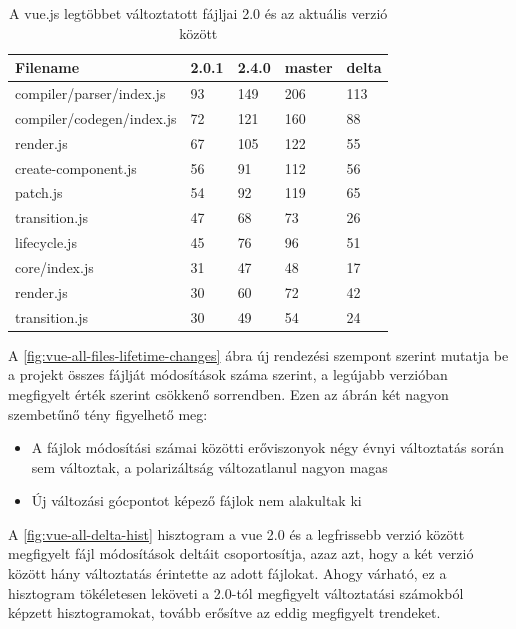 \begin{table}[h]
    \centering
    \begin{tabular}{l|l|l|l|l}
        Filename                  & 2.0.1 & 2.4.0 & master & delta \\ \hline
        compiler/parser/index.js  & 93    & 149   & 206    & 113   \\
        compiler/codegen/index.js & 72    & 121   & 160    & 88    \\
        render.js                 & 67    & 105   & 122    & 55    \\
        create-component.js       & 56    & 91    & 112    & 56    \\
        patch.js                  & 54    & 92    & 119    & 65    \\
        transition.js             & 47    & 68    & 73     & 26    \\
        lifecycle.js              & 45    & 76    & 96     & 51    \\
        core/index.js             & 31    & 47    & 48     & 17    \\
        render.js                 & 30    & 60    & 72     & 42    \\
        transition.js             & 30    & 49    & 54     & 24
    \end{tabular}
    \caption{A vue.js legtöbbet változtatott fájljai 2.0 és az aktuális verzió között}
    \label{tab:vue-changes-comp}
\end{table}

A \ref{fig:vue-all-files-lifetime-changes} ábra új rendezési szempont szerint mutatja be a projekt összes fájlját módosítások száma szerint, a legújabb verzióban megfigyelt érték szerint csökkenő sorrendben. Ezen az ábrán két nagyon szembetűnő tény figyelhető meg:
\begin{itemize}
    \item A fájlok módosítási számai közötti erőviszonyok négy évnyi változtatás során sem változtak, a polarizáltság változatlanul nagyon magas
    \item Új változási gócpontot képező fájlok nem alakultak ki
\end{itemize}

A \ref{fig:vue-all-delta-hist} hisztogram a vue 2.0 és a legfrissebb verzió között megfigyelt fájl módosítások deltáit csoportosítja, azaz azt, hogy a két verzió között hány változtatás érintette az adott fájlokat. Ahogy várható, ez a hisztogram tökéletesen leköveti a 2.0-tól megfigyelt változtatási számokból képzett hisztogramokat, tovább erősítve az eddig megfigyelt trendeket.

